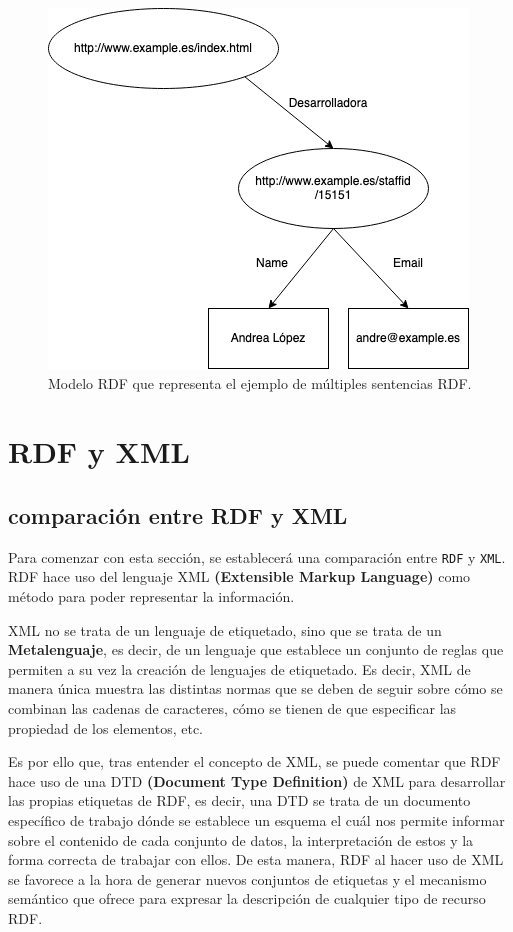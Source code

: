 \documentclass[11pt]{report}
\begin{document}
\begin{figure}[H]
	\centering
	\includegraphics[scale=0.7]{../img/Modelo-RDF.png}
	\caption{Modelo RDF que representa el ejemplo de múltiples sentencias RDF.}
	\label{fig:Modelo-RDF}
\end{figure}

\chapter{RDF y XML}

\section{comparación entre RDF y XML}

Para comenzar con esta sección,  se establecerá una comparación entre \texttt{RDF} y \texttt{XML}. RDF hace uso del lenguaje XML \textbf{(Extensible Markup Language)} como método para poder representar la información.

XML no se trata de un lenguaje de etiquetado, sino que se trata de un \textbf{Metalenguaje}, es decir, de un lenguaje que establece un conjunto de reglas que permiten a su vez la creación de lenguajes de etiquetado. Es decir, XML de manera única muestra las distintas normas que se deben de seguir sobre cómo se combinan las cadenas de caracteres, cómo se tienen de que especificar las propiedad de los elementos, etc.

Es por ello que, tras entender el concepto de XML, se puede comentar que RDF hace uso de una DTD \textbf{(Document Type Definition)} de XML para desarrollar las propias etiquetas de RDF, es decir, una DTD se trata de un documento específico de trabajo dónde se establece un esquema el cuál nos permite informar sobre el contenido de cada conjunto de datos, la interpretación de estos y la forma correcta de trabajar con ellos. De esta manera, RDF al hacer uso de XML se favorece a la hora de generar nuevos conjuntos de etiquetas y el mecanismo semántico que ofrece para expresar la descripción de cualquier tipo de recurso RDF.
\end{document}
